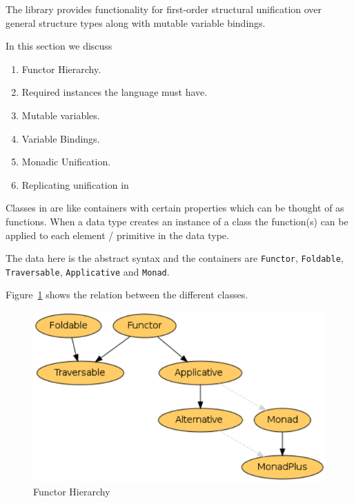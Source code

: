\documentclass[thesis-solanki.tex]{subfiles}
\begin{document}
  The library provides functionality for first-order structural unification over general structure types along with
  mutable variable bindings.

In this section we discuss
\begin{enumerate}
\item Functor Hierarchy.

\item Required instances the language must have.

\item Mutable variables.

\item Variable Bindings.

\item Monadic Unification.

\item Replicating  unification in 
\end{enumerate}

Classes in  are like containers with certain properties which can be thought of as functions. When a data type creates an
instance of a class the function(s) can be applied to each element / primitive in the data type.


The data here is the  abstract syntax and the containers are
\Verb!Functor!, \Verb!Foldable!, \Verb!Traversable!, \Verb!Applicative!
  and
\Verb!Monad!.

Figure~\ref{fig:Functor Hierarchy} shows the relation between the different classes.

\begin{figure}[th]
\centering
\includegraphics[scale = 0.7]{FunctorHierarchy.png}
\caption{Functor Hierarchy \cite{website:foldablenadtraversable}}
\label{fig:Functor Hierarchy}
\end{figure}
\end{document}
